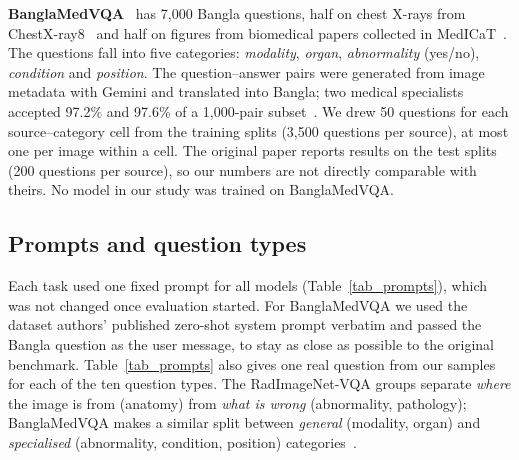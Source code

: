 \documentclass[doublecolumn]{ijcvsplatex}
\begin{document}
\textbf{BanglaMedVQA}~\cite{ahmed2026banglamedvqa} has 7,000 Bangla questions, half on chest X-rays from ChestX-ray8~\cite{wang2017chestxray8} and half on figures from biomedical papers collected in MedICaT~\cite{subramanian2020medicat}. The questions fall into five categories: \emph{modality}, \emph{organ}, \emph{abnormality} (yes/no), \emph{condition} and \emph{position}. The question--answer pairs were generated from image metadata with Gemini and translated into Bangla; two medical specialists accepted 97.2\% and 97.6\% of a 1,000-pair subset~\cite{ahmed2026banglamedvqa}. We drew 50 questions for each source--category cell from the training splits (3,500 questions per source), at most one per image within a cell. The original paper reports results on the test splits (200 questions per source), so our numbers are not directly comparable with theirs. No model in our study was trained on BanglaMedVQA.

\subsection{Prompts and question types}
Each task used one fixed prompt for all models (Table~\ref{tab_prompts}), which was not changed once evaluation started. For BanglaMedVQA we used the dataset authors' published zero-shot system prompt verbatim and passed the Bangla question as the user message, to stay as close as possible to the original benchmark. Table~\ref{tab_prompts} also gives one real question from our samples for each of the ten question types. The RadImageNet-VQA groups separate \emph{where} the image is from (anatomy) from \emph{what is wrong} (abnormality, pathology); BanglaMedVQA makes a similar split between \emph{general} (modality, organ) and \emph{specialised} (abnormality, condition, position) categories~\cite{ahmed2026banglamedvqa}.
\end{document}
